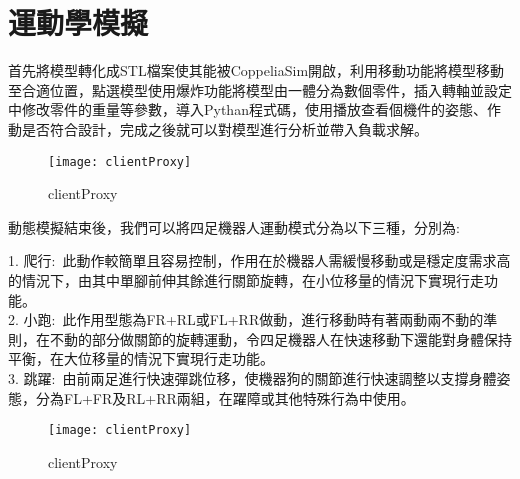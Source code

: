 \section{運動學模擬}
首先將模型轉化成STL檔案使其能被CoppeliaSim開啟，利用移動功能將模型移動至合適位置，點選模型使用爆炸功能將模型由一體分為數個零件，插入轉軸並設定中修改零件的重量等參數，導入Pythan程式碼，使用播放查看個機件的姿態、作動是否符合設計，完成之後就可以對模型進行分析並帶入負載求解。\\

\begin{figure}[hbt!]
\begin{center}
\texttt{[image: clientProxy]}
\caption{\Large clientProxy}\label{clientProxy}
\end{center}
\end{figure}

動態模擬結束後，我們可以將四足機器人運動模式分為以下三種，分別為:\

1. 爬行:\
此動作較簡單且容易控制，作用在於機器人需緩慢移動或是穩定度需求高的情況下，由其中單腳前伸其餘進行關節旋轉，在小位移量的情況下實現行走功能。\\

2. 小跑:\
此作用型態為FR+RL或FL+RR做動，進行移動時有著兩動兩不動的準則，在不動的部分做關節的旋轉運動，令四足機器人在快速移動下還能對身體保持平衡，在大位移量的情況下實現行走功能。\\

3. 跳躍:\
由前兩足進行快速彈跳位移，使機器狗的關節進行快速調整以支撐身體姿態，分為FL+FR及RL+RR兩組，在躍障或其他特殊行為中使用。\\

\begin{figure}[hbt!]
\begin{center}
\texttt{[image: clientProxy]}
\caption{\Large clientProxy}\label{clientProxy}
\end{center}
\end{figure}
\newpage
